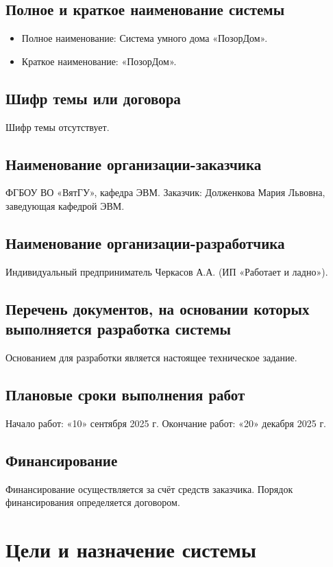 \documentclass[oneside,a4paper,14pt]{extarticle}
\begin{document}
\subsection{Полное и краткое наименование системы}
\begin{itemize}
    \item Полное наименование: Система умного дома «ПозорДом».
    \item Краткое наименование: «ПозорДом».
\end{itemize}

\subsection{Шифр темы или договора}
Шифр темы отсутствует.

\subsection{Наименование организации-заказчика}
ФГБОУ ВО «ВятГУ», кафедра ЭВМ.  
Заказчик: Долженкова Мария Львовна, заведующая кафедрой ЭВМ.

\subsection{Наименование организации-разработчика}
Индивидуальный предприниматель Черкасов А.А. (ИП «Работает и ладно»).

\subsection{Перечень документов, на основании которых выполняется разработка системы}
Основанием для разработки является настоящее техническое задание.

\subsection{Плановые сроки выполнения работ}
Начало работ: «10» сентября 2025 г.  
Окончание работ: «20» декабря 2025 г.

\subsection{Финансирование}
Финансирование осуществляется за счёт средств заказчика. Порядок финансирования определяется договором.

\section{Цели и назначение системы}
\end{document}
